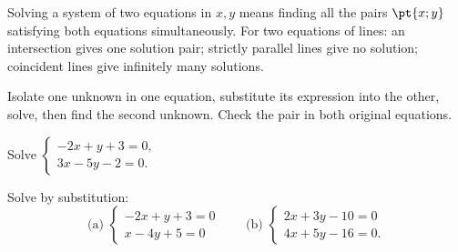 \begin{keypoint}[Definition]
Solving a system of two equations in $x,y$ means finding all the pairs $\pt{x;y}$ satisfying both equations simultaneously. For two equations of lines: an intersection gives one solution pair; strictly parallel lines give no solution; coincident lines give infinitely many solutions.
\end{keypoint}
\begin{method}[Substitution]
Isolate one unknown in one equation, substitute its expression into the other, solve, then find the second unknown. Check the pair in both original equations.
\end{method}
\begin{example}Solve $\begin{cases}-2x+y+3=0,\\3x-5y-2=0.\end{cases}$\end{example}
\begin{example}Solve by substitution:
\[\text{(a) }\begin{cases}-2x+y+3=0\\x-4y+5=0\end{cases}\qquad
\text{(b) }\begin{cases}2x+3y-10=0\\4x+5y-16=0.\end{cases}\]\end{example}

